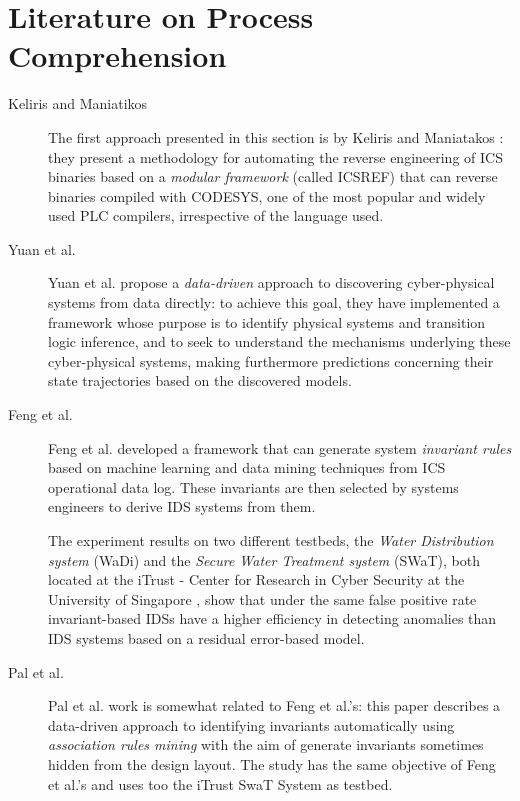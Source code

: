 \section{Literature on Process Comprehension}
\label{sec:related_work}
\begin{description}
	\item[Keliris and Maniatikos] The first approach presented in this section is by Keliris and Maniatakos \cite{keliris_maniatakos}: they present a methodology for automating the reverse engineering of ICS binaries based on a \textit{modular framework} (called ICSREF) that can reverse binaries compiled with CODESYS, one of the most popular and widely used PLC compilers, irrespective of the language used.
	
	\item[Yuan et al.] Yuan et al. \cite{yuan_et_al} propose a \textit{data-driven} approach to discovering cyber-physical systems from data directly: to achieve this goal, they have implemented a framework whose purpose is to identify physical systems and transition logic inference, and to seek to understand the mechanisms underlying these cyber-physical systems, making furthermore predictions concerning their state trajectories based on the discovered models.
	
	\item[Feng et al.] Feng et al. \cite{feng_swat} developed a framework that can generate system \textit{invariant rules} based on machine learning and data mining techniques from ICS operational data log. These invariants are then selected by systems engineers to derive IDS systems from them.
	
	The experiment results on two different testbeds, the \textit{Water Distribution system} (WaDi) and the \textit{Secure Water Treatment system} (SWaT), both located at the iTrust - Center for Research in Cyber Security at the University of Singapore \cite{itrust_site}, show that under the same false positive rate invariant-based IDSs have a higher efficiency in detecting anomalies than IDS systems based on a residual error-based model. 
	
	\item[Pal et al.] Pal et al. \cite{pal_et_al} work is somewhat related to Feng et al.'s: this paper describes a data-driven approach to identifying invariants automatically using \textit{association rules mining} \cite{association_rules_mining} with the aim of generate invariants sometimes hidden from the design layout. The study has the same objective of Feng et al.'s and uses too the iTrust SwaT System as testbed.
	

\end{description}
